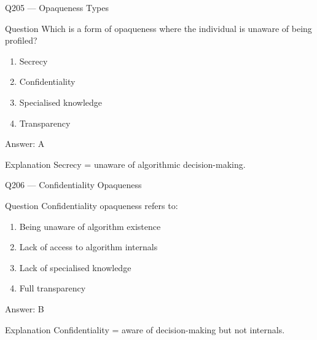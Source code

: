 \documentclass[aspectratio=169,8pt]{beamer}
\begin{document}
								\begin{frame}{Q205 --- Opaqueness Types}
									\begin{block}{Question}
										Which is a form of opaqueness where the individual is unaware of being profiled?
										\begin{enumerate}
											\item Secrecy
											\item Confidentiality
											\item Specialised knowledge
											\item Transparency
										\end{enumerate}
									\end{block}
									\begin{exampleblock}{Answer: A}\end{exampleblock}
									\begin{block}{Explanation}
										Secrecy = unaware of algorithmic decision-making.
									\end{block}
								\end{frame}
								
								\begin{frame}{Q206 --- Confidentiality Opaqueness}
									\begin{block}{Question}
										Confidentiality opaqueness refers to:
										\begin{enumerate}
											\item Being unaware of algorithm existence
											\item Lack of access to algorithm internals
											\item Lack of specialised knowledge
											\item Full transparency
										\end{enumerate}
									\end{block}
									\begin{exampleblock}{Answer: B}\end{exampleblock}
									\begin{block}{Explanation}
										Confidentiality = aware of decision-making but not internals.
									\end{block}
								\end{frame}
								
\end{document}
